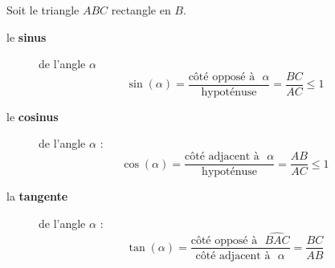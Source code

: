 \begin{definition}
	Soit le triangle $ABC$ rectangle en $B$. 
	\begin{description} 
		\item[le \textbf{sinus}]   de l'angle $\alpha$   
		$$ \sin(\alpha) = \frac{\text{côté opposé à  $\alpha$}}{\text{hypoténuse}} = \frac{BC}{AC}  \leqslant  1$$ 
		\item[le \textbf{cosinus}] de l'angle $\alpha$ : 
		$$ \cos(\alpha) = \frac{\text{côté adjacent à  $\alpha$}}{\text{hypoténuse}} = \frac{AB}{AC} \leqslant  1 $$ 
		\item[la \textbf{tangente}] de l'angle $\alpha$ :
		$$ \tan(\alpha) = \frac{\text{côté opposé à  $\widehat{BAC}$}}{\text{côté adjacent à  $\alpha$}} = \frac{BC}{AB} $$
	\end{description} 
\end{definition}
 
		\vfill 